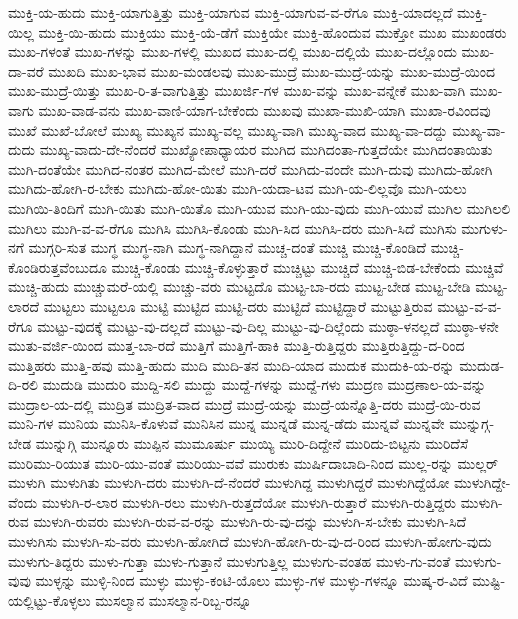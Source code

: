 {ಮುಕ್ತಿ-ಯ-ಹುದು
ಮುಕ್ತಿ-ಯಾಗುತ್ತಿತ್ತು
ಮುಕ್ತಿ-ಯಾಗುವ
ಮುಕ್ತಿ-ಯಾಗುವ-ವ-ರೆಗೂ
ಮುಕ್ತಿ-ಯಾದಲ್ಲದೆ
ಮುಕ್ತಿ-ಯಿಲ್ಲ
ಮುಕ್ತಿ-ಯಿ-ಹುದು
ಮುಕ್ತಿಯು
ಮುಕ್ತಿ-ಯೆ-ಡೆಗೆ
ಮುಕ್ತಿಯೇ
ಮುಕ್ತಿ-ಹೊಂದುವ
ಮುಕ್ತೋ
ಮುಖ
ಮುಖಂಡರು
ಮುಖ-ಗಳಂತೆ
ಮುಖ-ಗಳನ್ನು
ಮುಖ-ಗಳಲ್ಲಿ
ಮುಖದ
ಮುಖ-ದಲ್ಲಿ
ಮುಖ-ದಲ್ಲಿಯೆ
ಮುಖ-ದಲ್ಲೊಂದು
ಮುಖ-ದಾ-ವರೆ
ಮುಖದಿ
ಮುಖ-ಭಾವ
ಮುಖ-ಮಂಡಲವು
ಮುಖ-ಮುದ್ರೆ
ಮುಖ-ಮುದ್ರೆ-ಯನ್ನು
ಮುಖ-ಮುದ್ರೆ-ಯಿಂದ
ಮುಖ-ಮುದ್ರೆ-ಯಿತ್ತು
ಮುಖ-ರಿ-ತ-ವಾಗುತ್ತಿತ್ತು
ಮುಖರ್ಜಿ-ಗಳ
ಮುಖ-ವನ್ನು
ಮುಖ-ವನ್ನೇಕೆ
ಮುಖ-ವಾಗಿ
ಮುಖ-ವಾಗು
ಮುಖ-ವಾಡ-ವನು
ಮುಖ-ವಾಣಿ-ಯಾಗ-ಬೇಕೆಂದು
ಮುಖವು
ಮುಖಾ-ಮುಖಿ-ಯಾಗಿ
ಮುಖಾ-ರವಿಂದವು
ಮುಖೆ
ಮುಖೆ-ಬೋಲೆ
ಮುಖ್ಯ
ಮುಖ್ಯನ
ಮುಖ್ಯ-ವಲ್ಲ
ಮುಖ್ಯ-ವಾಗಿ
ಮುಖ್ಯ-ವಾದ
ಮುಖ್ಯ-ವಾ-ದದ್ದು
ಮುಖ್ಯ-ವಾ-ದುದು
ಮುಖ್ಯ-ವಾದು-ದೇ-ನೆಂದರೆ
ಮುಖ್ಯೋಪಾಧ್ಯಾಯರ
ಮುಗಿದ
ಮುಗಿದಂತಾ-ಗುತ್ತದೆಯೇ
ಮುಗಿದಂತಾಯಿತು
ಮುಗಿ-ದಂತೆಯೇ
ಮುಗಿದ-ನಂತರ
ಮುಗಿದ-ಮೇಲೆ
ಮುಗಿ-ದರೆ
ಮುಗಿದು-ವಂದೇ
ಮುಗಿ-ದುವು
ಮುಗಿದು-ಹೋಗಿ
ಮುಗಿದು-ಹೋಗಿ-ರ-ಬೇಕು
ಮುಗಿದು-ಹೋ-ಯಿತು
ಮುಗಿ-ಯದಾ-ಟವ
ಮುಗಿ-ಯ-ಲಿಲ್ಲವೊ
ಮುಗಿ-ಯಲು
ಮುಗಿಯಿ-ತಿಂದಿಗೆ
ಮುಗಿ-ಯಿತು
ಮುಗಿ-ಯಿತೊ
ಮುಗಿ-ಯುವ
ಮುಗಿ-ಯು-ವುದು
ಮುಗಿ-ಯುವೆ
ಮುಗಿಲ
ಮುಗಿಲಲಿ
ಮುಗಿಲು
ಮುಗಿ-ವ-ವ-ರೆಗೂ
ಮುಗಿಸಿ
ಮುಗಿಸಿ-ಕೊಂಡು
ಮುಗಿ-ಸಿದ
ಮುಗಿಸಿ-ದರು
ಮುಗಿ-ಸಿದೆ
ಮುಗಿಸು
ಮುಗುಳು-ನಗೆ
ಮುಗ್ಗರಿ-ಸುತ
ಮುಗ್ಧ
ಮುಗ್ಧ-ನಾಗಿ
ಮುಗ್ಧ-ನಾಗಿದ್ದಾನೆ
ಮುಚ್ಚ-ದಂತೆ
ಮುಚ್ಚಿ
ಮುಚ್ಚಿ-ಕೊಂಡಿದೆ
ಮುಚ್ಚಿ-ಕೊಂಡಿರುತ್ತವೆಂಬುದೂ
ಮುಚ್ಚಿ-ಕೊಂಡು
ಮುಚ್ಚಿ-ಕೊಳ್ಳುತ್ತಾರೆ
ಮುಚ್ಚಿಟ್ಟು
ಮುಚ್ಚಿದೆ
ಮುಚ್ಚಿ-ಬಿಡ-ಬೇಕೆಂದು
ಮುಚ್ಚಿವೆ
ಮುಚ್ಚಿ-ಹುದು
ಮುಚ್ಚುಮರೆ-ಯಲ್ಲಿ
ಮುಚ್ಚು-ವರು
ಮುಟ್ಟದೊ
ಮುಟ್ಟ-ಬಾ-ರದು
ಮುಟ್ಟ-ಬೇಡ
ಮುಟ್ಟ-ಬೇಡಿ
ಮುಟ್ಟ-ಲಾರದೆ
ಮುಟ್ಟಲು
ಮುಟ್ಟಲೂ
ಮುಟ್ಟಿ
ಮುಟ್ಟಿದ
ಮುಟ್ಟಿ-ದರು
ಮುಟ್ಟಿದೆ
ಮುಟ್ಟಿದ್ದಾರೆ
ಮುಟ್ಟುತ್ತಿರುವ
ಮುಟ್ಟು-ವ-ವ-ರೆಗೂ
ಮುಟ್ಟು-ವುದಕ್ಕೆ
ಮುಟ್ಟು-ವು-ದಲ್ಲದೆ
ಮುಟ್ಟು-ವು-ದಿಲ್ಲ
ಮುಟ್ಟು-ವು-ದಿಲ್ಲೆಂದು
ಮುಠ್ಠಾ-ಳನಲ್ಲದೆ
ಮುಠ್ಠಾ-ಳನೇ
ಮುತು-ವರ್ಜಿ-ಯಿಂದ
ಮುತ್ತ-ಬಾ-ರದೆ
ಮುತ್ತಿಗೆ
ಮುತ್ತಿಗೆ-ಹಾಕಿ
ಮುತ್ತಿ-ರುತ್ತಿದ್ದರು
ಮುತ್ತಿರುತ್ತಿದ್ದು-ದ-ರಿಂದ
ಮುತ್ತಿಹರು
ಮುತ್ತಿ-ಹವು
ಮುತ್ತಿ-ಹುದು
ಮುದಿ
ಮುದಿ-ತನ
ಮುದಿ-ಯಾದ
ಮುದುಕ
ಮುದುಕಿ-ಯ-ರನ್ನು
ಮುದುಡ-ದಿ-ರಲಿ
ಮುದುಡಿ
ಮುದುರಿ
ಮುದ್ದಿ-ಸಲಿ
ಮುದ್ದು
ಮುದ್ದೆ-ಗಳನ್ನು
ಮುದ್ದೆ-ಗಳು
ಮುದ್ರಣ
ಮುದ್ರಣಾಲ-ಯ-ವನ್ನು
ಮುದ್ರಾಲ-ಯ-ದಲ್ಲಿ
ಮುದ್ರಿತ
ಮುದ್ರಿತ-ವಾದ
ಮುದ್ರೆ
ಮುದ್ರೆ-ಯನ್ನು
ಮುದ್ರೆ-ಯನ್ನೊತ್ತಿ-ದರು
ಮುದ್ರೆ-ಯಿ-ರುವ
ಮುನಿ-ಗಳ
ಮುನಿಯ
ಮುನಿಸಿ-ಕೊಳುವೆ
ಮುನಿಸಿನ
ಮುನ್ನ
ಮುನ್ನಡೆ
ಮುನ್ನ-ಡೆದು
ಮುನ್ನವೆ
ಮುನ್ನವೇ
ಮುನ್ನುಗ್ಗ-ಬೇಡ
ಮುನ್ನುಗ್ಗಿ
ಮುನ್ನೂರು
ಮುಪ್ಪಿನ
ಮುಮೂರ್ಷು
ಮುಯ್ಯಿ
ಮುರಿ-ದಿದ್ದೇನೆ
ಮುರಿದು-ಬಿಟ್ಟನು
ಮುರಿದೆಸೆ
ಮುರಿಮು-ರಿಯುತ
ಮುರಿ-ಯು-ವಂತೆ
ಮುರಿಯು-ವವೆ
ಮುರುಕು
ಮುರ್ಷಿದಾಬಾದಿ-ನಿಂದ
ಮುಲ್ಲ-ರನ್ನು
ಮುಲ್ಲರ್
ಮುಳುಗಿ
ಮುಳುಗಿತು
ಮುಳುಗಿ-ದರು
ಮುಳುಗಿ-ದೆ-ನೆಂದರೆ
ಮುಳುಗಿದ್ದ
ಮುಳುಗಿದ್ದರೆ
ಮುಳುಗಿದ್ದೆಯೋ
ಮುಳುಗಿದ್ದೇ-ವೆಂದು
ಮುಳುಗಿ-ರ-ಲಾರ
ಮುಳುಗಿ-ರಲು
ಮುಳುಗಿ-ರುತ್ತದೆಯೋ
ಮುಳುಗಿ-ರುತ್ತಾರೆ
ಮುಳುಗಿ-ರುತ್ತಿದ್ದರು
ಮುಳುಗಿ-ರುವ
ಮುಳುಗಿ-ರುವರು
ಮುಳುಗಿ-ರುವ-ವ-ರನ್ನು
ಮುಳುಗಿ-ರು-ವು-ದನ್ನು
ಮುಳುಗಿ-ಸ-ಬೇಕು
ಮುಳುಗಿ-ಸಿದೆ
ಮುಳುಗಿಸು
ಮುಳುಗಿ-ಸು-ವರು
ಮುಳುಗಿ-ಹೋಗಿದೆ
ಮುಳುಗಿ-ಹೋಗಿ-ರು-ವು-ದ-ರಿಂದ
ಮುಳುಗಿ-ಹೋಗು-ವುದು
ಮುಳುಗು-ತಿದ್ದರು
ಮುಳು-ಗುತ್ತಾ
ಮುಳು-ಗುತ್ತಾನೆ
ಮುಳುಗುತ್ತಿಲ್ಲ
ಮುಳುಗು-ವಂತಹ
ಮುಳು-ಗು-ವಂತೆ
ಮುಳುಗು-ವುವು
ಮುಳ್ಳನ್ನು
ಮುಳ್ಳಿ-ನಿಂದ
ಮುಳ್ಳು
ಮುಳ್ಳು-ಕಂಟಿ-ಯೊಲು
ಮುಳ್ಳು-ಗಳ
ಮುಳ್ಳು-ಗಳನ್ನೂ
ಮುಷ್ಕ-ರ-ವಿದೆ
ಮುಷ್ಟಿ-ಯಲ್ಲಿಟ್ಟು-ಕೊಳ್ಳಲು
ಮುಸಲ್ಮಾನ
ಮುಸಲ್ಮಾನ-ರಿಬ್ಬ-ರನ್ನೂ
}

